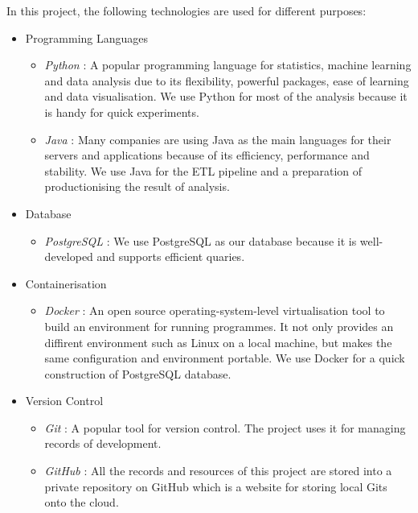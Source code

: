 \documentclass[11pt]{article} %
\theoremstyle{plain}
\theoremstyle{definition}
\begin{document}
In this project, the following technologies are used for different purposes:
\begin{itemize}
  \item Programming Languages
  \begin{itemize}
    \item \textsl{Python} : A popular programming language for statistics, machine learning and data analysis due to its flexibility, powerful packages, ease of learning and data visualisation. We use Python for most of the analysis because it is handy for quick experiments.
    \item \textsl{Java} : Many companies are using Java as the main languages for their servers and applications because of its efficiency, performance and stability. We use Java for the ETL pipeline and a preparation of productionising the result of analysis.
  \end{itemize}

  \item Database
  \begin{itemize}
    \item \textsl{PostgreSQL}\cite{postgresql} : We use PostgreSQL as our database because it is well-developed and supports efficient quaries.
  \end{itemize}

  \item Containerisation
  \begin{itemize}
    \item \textsl{Docker}\cite{docker} : An open source operating-system-level virtualisation tool to build an environment for running programmes. It not only provides an diffirent environment such as Linux on a local machine, but makes the same configuration and environment portable. We use Docker for a quick construction of PostgreSQL database.
  \end{itemize}

  \item Version Control
  \begin{itemize}
    \item \textsl{Git}\cite{git} : A popular tool for version control. The project uses it for managing records of development.
    \item \textsl{GitHub}\cite{github} : All the records and resources of this project are stored into a private repository on GitHub which is a website for storing local Gits onto the cloud.
  \end{itemize}


\end{itemize}
\end{document}
